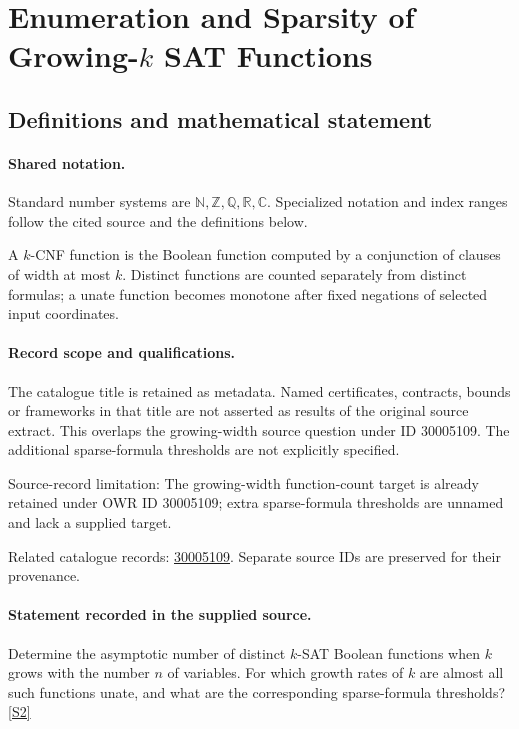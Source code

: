 \documentclass[11pt]{article}
\newcommand{\sref}[2]{\hyperlink{source:#1:#2}{[S#2]}}
\begin{document}
\section{Enumeration and Sparsity of Growing-$k$ SAT Functions}\label{statement}

\subsection{Definitions and mathematical statement}

\paragraph{Shared notation.}Standard number systems are $\mathbb N,\mathbb Z,\mathbb Q,\mathbb R,\mathbb C$. Specialized notation and index ranges follow the cited source and the definitions below.


A $k$-CNF function is the Boolean function computed by a conjunction of clauses of width at most $k$. Distinct functions are counted separately from distinct formulas; a unate function becomes monotone after fixed negations of selected input coordinates.
\paragraph{Record scope and qualifications.}
The catalogue title is retained as metadata. Named certificates, contracts, bounds or frameworks in that title are not asserted as results of the original source extract.
This overlaps the growing-width source question under ID 30005109. The additional sparse-formula thresholds are not explicitly specified.

Source-record limitation: The growing-width function-count target is already retained under OWR ID 30005109; extra sparse-formula thresholds are unnamed and lack a supplied target.

Related catalogue records: \href{https://mehmetmars7.github.io/Erdosproblems-llm-hunter/problem.html?type=open_problems&id=30005109}{30005109}. Separate source IDs are preserved for their provenance.
\paragraph{Statement recorded in the supplied source.}
Determine the asymptotic number of distinct $k$-SAT Boolean functions when $k$ grows with the number $n$ of variables. For which growth rates of $k$ are almost all such functions unate, and what are the corresponding sparse-formula thresholds? \sref{statement}{2}
\end{document}
